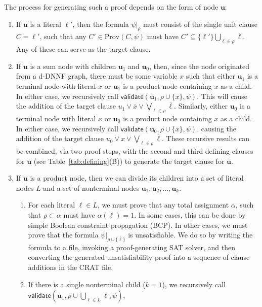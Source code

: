 \documentclass[letterpaper,USenglish,cleveref, autoref, thm-restate]{lipics-v2021}
\newcommand{\obar}[1]{\overline{#1}}
\newcommand{\lit}{\ell}
\newcommand{\passign}{\rho}
\newcommand{\validate}{\textsf{validate}}
\newcommand{\prov}{\textrm{Prov}}
\newcommand{\makenode}[1]{\mathbf{#1}}
\newcommand{\nodeu}{\makenode{u}}
\newcommand{\simplify}[2]{#1|_{#2}}
\begin{document}
The process for generating such a proof depends on the form of node $\nodeu$:
\begin{enumerate}
\item If $\nodeu$ is a literal $\lit'$, then the formula
  $\simplify{\psi}{\passign}$ must consist of the single unit clause
  $C = \lit'$, such that any $C' \in \prov(C, \psi)$ must have $C' \subseteq \{ \lit' \} \bigcup_{\lit \in \passign} \obar{\lit}$.
  Any of these can
  serve as the target clause.
\item If $\nodeu$ is a sum node with children $\nodeu_1$ and $\nodeu_0$,
  then, since the node originated from a d-DNNF graph, there must be
  some variable $x$ such that either $\nodeu_1$ is a terminal node with literal $x$ or $\nodeu_1$ is a
  product node containing $x$ as a child.  In either case, we
  recursively call $\validate(\nodeu_1, \passign \cup \{ x \}, \psi)$.
  This will cause the addition of the target clause
  $u_1 \lor \obar{x} \lor \bigvee_{\lit \in \passign} \obar{\lit}$.
Similarly, either $\nodeu_0$ is a terminal node with literal $\obar{x}$ or $\nodeu_0$ is a product node containing $\obar{x}$ as
  a child.  In either case, we recursively call $\validate(\nodeu_0, \passign \cup \{ \obar{x} \}, \psi)$,
  causing the addition of the target clause
  $u_0 \lor x \lor \bigvee_{\lit \in \passign} \obar{\lit}$.
  These recursive results can be combined, via two proof steps, with the second and third defining clauses for $\nodeu$
(see Table~\ref{tab:defining}(B))
  to generate the target clause for $\nodeu$.
\item If $\nodeu$ is a product node, then we can divide its children
  into a set of literal nodes $L$ and a set of nonterminal nodes $\nodeu_1, \nodeu_2, \ldots, \nodeu_k$.
  \begin{enumerate}
    \item For each literal
  $\lit \in L$, we must prove that any total assignment $\alpha$, such that
  $\passign \subset \alpha$ must have $\alpha(\lit) = 1$.  In some
  cases, this can be done by simple Boolean constraint propagation (BCP).
  In other cases, we must prove that the formula
  $\simplify{\psi}{\passign \cup \{\obar{\lit}\}}$ is unsatisfiable.  We
  do so by writing the formula to a file, invoking a proof-generating
  SAT solver, and then converting the generated unsatisfiability proof
  into a sequence of clause additions in the CRAT file.
\item If there is a single nonterminal child ($k = 1$), we recursively call
  $\validate \left(\nodeu_1, \passign \cup \bigcup_{\lit \in L} \lit, \psi\right)$,

\end{enumerate}
\end{enumerate}
\end{document}
